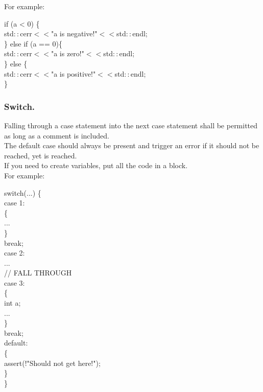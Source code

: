 For example:
\begin{algorithm}[H]
if (a < 0) \{ \\
std$::$cerr$<<$"a is negative!"$<<$std$::$endl; \\
\} else if (a == 0)\{ \\
std$::$cerr$<<$"a is zero!"$<<$std$::$endl; \\
\} else \{ \\
std$::$cerr$<<$"a is positive!"$<<$std$::$endl; \\
\}
\end{algorithm}

\subsubsection{Switch.}
Falling through a case statement into the next case statement shall be
permitted as long as a comment is included.\\
The default case should always be present and trigger an error if it
should not be reached, yet is reached.\\
If you need to create variables, put all the code in a block.\\

For example:
\begin{algorithm}[H]
switch(...) \{ \\
case 1: \\
\{ \\
... \\
\} \\
break; \\
case 2: \\
... \\
// FALL THROUGH \\
case 3: \\
\{ \\
int a; \\
... \\
\} \\
break; \\
default: \\
\{ \\
assert(!"Should not get here!"); \\
\} \\
\}
\end{algorithm}

